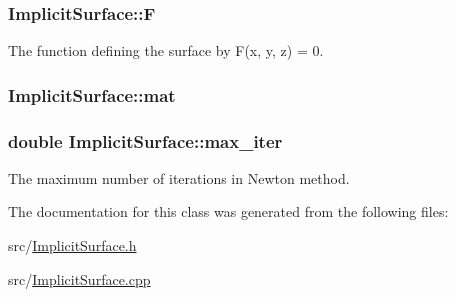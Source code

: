 \subsubsection[{\texorpdfstring{F}{F}}]{ Implicit\+Surface\+::F\hspace{0.3cm}{\ttfamily [private]}}\hypertarget{classImplicitSurface_aeeafee33bf827627323373167ce841eb}{}\label{classImplicitSurface_aeeafee33bf827627323373167ce841eb}


The function defining the surface by F(x, y, z) = 0. 

\subsubsection[{\texorpdfstring{mat}{mat}}]{ Implicit\+Surface\+::mat\hspace{0.3cm}{\ttfamily [private]}}\hypertarget{classImplicitSurface_adbb94dbb4d3271d5ed18752dde4aac32}{}\label{classImplicitSurface_adbb94dbb4d3271d5ed18752dde4aac32}
\subsubsection[{\texorpdfstring{max\+\_\+iter}{max_iter}}]{\setlength{\rightskip}{0pt plus 5cm}double Implicit\+Surface\+::max\+\_\+iter\hspace{0.3cm}{\ttfamily [private]}}\hypertarget{classImplicitSurface_ad92c06925b2496b7fe3a1d2659a87075}{}\label{classImplicitSurface_ad92c06925b2496b7fe3a1d2659a87075}


The maximum number of iterations in Newton method. 



The documentation for this class was generated from the following files\+:\begin{DoxyCompactItemize}
\item 
src/\hyperlink{ImplicitSurface_8h}{Implicit\+Surface.\+h}\item 
src/\hyperlink{ImplicitSurface_8cpp}{Implicit\+Surface.\+cpp}\end{DoxyCompactItemize}
